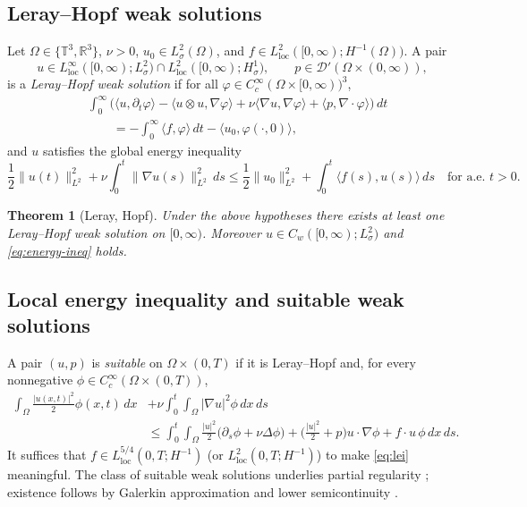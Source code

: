 \IfFileExists{nyjm.cls}{\documentclass[11pt]{nyjm}}{\documentclass[11pt]{amsart}}
\newcommand{\R}{\mathbb{R}}
\newcommand{\T}{\mathbb{T}}
\theoremstyle{plain}
\newtheorem{theorem}{Theorem}[section]
\theoremstyle{definition}
\theoremstyle{remark}
\begin{document}
\subsection{Leray--Hopf weak solutions}\label{subsec:leray-hopf}
Let $\Omega\in\{\T^3,\R^3\}$, $\nu>0$, $u_0\in L^2_\sigma(\Omega)$, and $f\in L^2_{\mathrm{loc}}([0,\infty);H^{-1}(\Omega))$. A pair
\[
u\in L^\infty_{\mathrm{loc}}([0,\infty);L^2_\sigma)\cap L^2_{\mathrm{loc}}([0,\infty);H^1_\sigma),
\qquad
p\in\mathcal D'(\Omega\times(0,\infty)),
\]
is a \emph{Leray--Hopf weak solution} if for all $\varphi\in C_c^\infty(\Omega\times[0,\infty))^3$,
\begin{align*}
&\int_0^\infty\!\!\Big(\langle u,\partial_t\varphi\rangle
-\langle u\otimes u,\nabla\varphi\rangle
+\nu\langle \nabla u,\nabla\varphi\rangle
+\langle p,\nabla\!\cdot\varphi\rangle\Big)\,dt \\
&\qquad= -\int_0^\infty\!\!\langle f,\varphi\rangle\,dt
-\langle u_0,\varphi(\cdot,0)\rangle,
\end{align*}
and $u$ satisfies the global energy inequality
\begin{equation}\label{eq:energy-ineq}
\frac12\|u(t)\|_{L^2}^2+\nu\!\int_0^t\!\|\nabla u(s)\|_{L^2}^2\,ds
\le \frac12\|u_0\|_{L^2}^2+\int_0^t\!\langle f(s),u(s)\rangle\,ds
\quad\text{for a.e. }t>0.
\end{equation}

\begin{theorem}[Leray, Hopf]\label{thm:leray-hopf-existence}
Under the above hypotheses there exists at least one Leray--Hopf weak solution on $[0,\infty)$. Moreover $u\in C_w([0,\infty);L^2_\sigma)$ and \eqref{eq:energy-ineq} holds. \cite{Leray1934,Hopf1951,Temam2001,Lemarie2002}
\end{theorem}

\subsection{Local energy inequality and suitable weak solutions}\label{subsec:suitable}
A pair $(u,p)$ is \emph{suitable} on $\Omega\times(0,T)$ if it is Leray--Hopf and, for every nonnegative $\phi\in C_c^\infty(\Omega\times(0,T))$,
\begin{align}\label{eq:lei}
\int_\Omega \frac{|u(x,t)|^2}{2}\phi(x,t)\,dx
&+\nu\!\int_0^t\!\!\int_\Omega |\nabla u|^2\phi\,dx\,ds \nonumber\\
&\le \int_0^t\!\!\int_\Omega \frac{|u|^2}{2}\big(\partial_s\phi+\nu\Delta\phi\big)
+ \big(\tfrac{|u|^2}{2}+p\big)u\cdot\nabla\phi
+ f\cdot u\,\phi \,dx\,ds .
\end{align}
It suffices that $f\in L^{5/4}_{\mathrm{loc}}(0,T;H^{-1})$ (or $L^2_{\mathrm{loc}}(0,T;H^{-1})$) to make \eqref{eq:lei} meaningful. The class of suitable weak solutions underlies partial regularity \cite{Scheffer1976,CKN1982}; existence follows by Galerkin approximation and lower semicontinuity \cite{Temam2001,Lemarie2002}.
\end{document}
